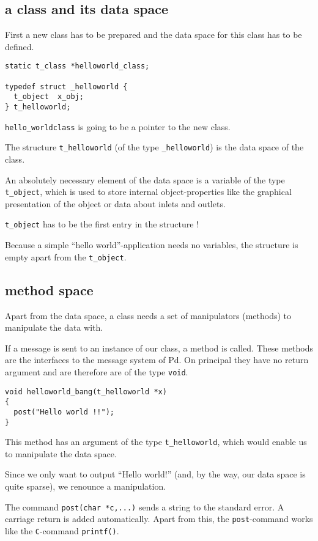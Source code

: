 \documentclass[12pt, a4paper,english,titlepage]{article}
\begin{document}
\subsection{a class and its data space}
First a new class has to be prepared and the data space for this class has to be defined.

\begin{verbatim}
static t_class *helloworld_class;

typedef struct _helloworld {
  t_object  x_obj;
} t_helloworld;
\end{verbatim}

\verb+hello_worldclass+ is going to be a pointer to the new class.

The structure \verb+t_helloworld+ (of the type \verb+_helloworld+) is
the data space of the class.

An absolutely necessary element of the data space is a variable of the type
\verb+t_object+, which is used to store internal object-properties like
the graphical presentation of the object or data about inlets and outlets.

\verb+t_object+ has to be the first entry in the structure !

Because a simple ``hello world''-application needs no variables,
the structure is empty apart from the \verb+t_object+.


\subsection{method space}
Apart from the data space, a class needs a set of manipulators (methods) to
manipulate the data with.

If a message is sent to an instance of our class, a method is called.
These methods are the interfaces to the message system of Pd.
On principal they have no return argument and are therefore are of the
type \verb+void+.

\begin{verbatim}
void helloworld_bang(t_helloworld *x)
{
  post("Hello world !!");
}
\end{verbatim}


This method has an argument of the type \verb+t_helloworld+,
which would enable us to manipulate the data space.

Since we only want to output ``Hello world!''
(and, by the way, our data space is quite sparse),
we renounce a manipulation.

The command \verb+post(char *c,...)+ sends a string to the standard error.
A carriage return is added automatically.
Apart from this, the \verb+post+-command works like the {\tt C}-command \verb+printf()+.
\end{document}

